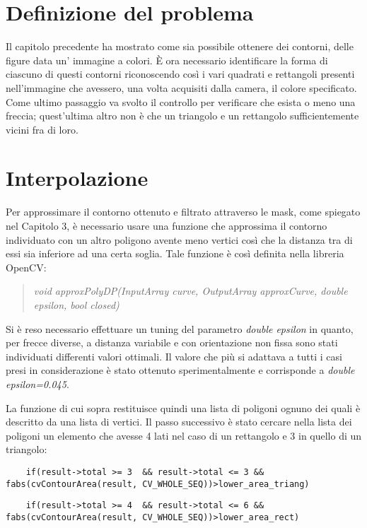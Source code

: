 \section{Definizione del problema}
Il capitolo precedente ha mostrato come sia possibile ottenere dei contorni, delle figure data un' immagine a colori.
È ora necessario identificare la forma di ciascuno di questi contorni riconoscendo così i vari quadrati e rettangoli presenti nell'immagine che avessero, una volta acquisiti dalla camera, il colore specificato. Come ultimo passaggio va svolto il controllo per verificare che esista o meno una freccia; quest'ultima altro non è che un triangolo e un rettangolo sufficientemente vicini fra di loro.

\section{Interpolazione}
Per approssimare il contorno ottenuto e filtrato attraverso le mask, come spiegato nel Capitolo 3, è necessario usare una funzione che approssima il contorno individuato con un altro poligono avente meno vertici così che la distanza tra di essi sia inferiore ad una certa soglia. Tale funzione è così definita nella libreria OpenCV:

\begin{quotation}
	\textsl{void approxPolyDP(InputArray curve, OutputArray approxCurve, double epsilon, bool closed)}
\end{quotation}

Si è reso necessario effettuare un tuning del parametro \textsl{double epsilon} in quanto, per frecce diverse, a distanza variabile e con orientazione non fissa sono stati individuati differenti valori ottimali. Il valore che più si adattava a tutti i casi presi in considerazione è stato ottenuto sperimentalmente e corrisponde a \textsl{double epsilon=0.045}.

La funzione di cui sopra restituisce quindi una lista di poligoni ognuno dei quali è descritto da una lista di vertici.
Il passo successivo è stato cercare nella lista dei poligoni un elemento che avesse 4 lati nel caso di un rettangolo e 3 in quello di un triangolo:

\begin{lstlisting}
	if(result->total >= 3  && result->total <= 3 && fabs(cvContourArea(result, CV_WHOLE_SEQ))>lower_area_triang)
\end{lstlisting}
\begin{lstlisting}
	if(result->total >= 4  && result->total <= 6 && fabs(cvContourArea(result, CV_WHOLE_SEQ))>lower_area_rect)
\end{lstlisting}

